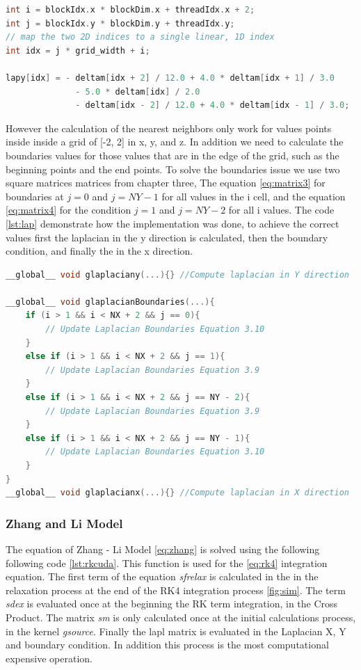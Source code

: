\begin{lstlisting}[language=C++, label={lst:lpay}, caption={Laplacian X using global memory}]
int i = blockIdx.x * blockDim.x + threadIdx.x + 2;
int j = blockIdx.y * blockDim.y + threadIdx.y;
// map the two 2D indices to a single linear, 1D index
int idx = j * grid_width + i;

lapy[idx] = - deltam[idx + 2] / 12.0 + 4.0 * deltam[idx + 1] / 3.0
			  - 5.0 * deltam[idx] / 2.0
			  - deltam[idx - 2] / 12.0 + 4.0 * deltam[idx - 1] / 3.0;	
\end{lstlisting}


However the calculation of the nearest neighbors only work for values points inside  inside a grid of [-2, 2] in x, y, and z. In addition we need to calculate the boundaries values for those values that are in the edge of the grid, such as the beginning points and the end points. To solve the boundaries issue we use two square matrices matrices from chapter three, The equation \ref{eq:matrix3} for boundaries at $j = 0$ and $j = NY - 1$ for all values in the i cell, and the equation \ref{eq:matrix4} for the condition $j = 1$ and $j = NY - 2$ for all i values. The code \ref{lst:lap} demonstrate how the implementation was done, to achieve the correct values first the laplacian in the y direction is calculated, then the boundary condition, and finally the in the x direction. 


\begin{lstlisting}[language=C++, label={lst:lap}, caption={Evaluation of Laplacian X, Y with boundary condition}]
__global__ void glaplaciany(...){} //Compute laplacian in Y direction

__global__ void glaplacianBoundaries(...){
    if (i > 1 && i < NX + 2 && j == 0){
     	// Update Laplacian Boundaries Equation 3.10
    }
    else if (i > 1 && i < NX + 2 && j == 1){
  		// Update Laplacian Boundaries Equation 3.9
    }
    else if (i > 1 && i < NX + 2 && j == NY - 2){
        // Update Laplacian Boundaries Equation 3.9
    }
    else if (i > 1 && i < NX + 2 && j == NY - 1){
        // Update Laplacian Boundaries Equation 3.10
    }
}
__global__ void glaplacianx(...){} //Compute laplacian in X direction
\end{lstlisting}

\subsubsection{Zhang and Li Model}

The equation of Zhang - Li Model \ref{eq:zhang} is solved using the following following code \ref{lst:rkcuda}. This function is used for the \ref{eq:rk4} integration equation. The first term of the equation \textit{sfrelax} is calculated in the in the relaxation process at the end of the RK4 integration process \ref{fig:sim}. The term \textit{sdex} is evaluated once at the beginning the RK term integration, in the Cross Product. The matrix \textit{sm} is only calculated once at the initial calculations process, in the kernel \textit{gsource}. Finally the lapl matrix is evaluated in the Laplacian X, Y and boundary condition. In addition this process is the most computational expensive  operation.

